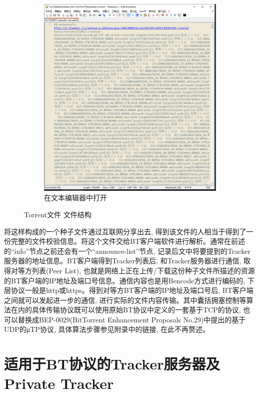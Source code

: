 \begin{figure}[ht!]
\begin{subfigure}{0.45\textwidth}
		\includegraphics[width=\textwidth]{support-files/2.1-torrent-file-in-text-editor.png} 
		\caption{在文本编辑器中打开}
		\label{fig:torrent_in_text_editor}
	\end{subfigure}
	\caption{Torrent文件 文件结构}
	\label{fig:torrent}
\end{figure}

将这样构成的一个种子文件通过互联网分享出去, 得到该文件的人相当于得到了一份完整的文件校验信息。将这个文件交给BT客户端软件进行解析。通常在前述的``info''节点之前还会有一个``announce-list''节点, 记录后文中将要提到的Tracker服务器的地址信息。BT客户端得到Tracker列表后, 和Tracker服务器进行通信, 取得对等方列表(Peer List), 也就是网络上正在上传/下载这份种子文件所描述的资源的BT客户端的IP地址及端口号信息。通信内容也是用Bencode方式进行编码的, 下层协议一般是http或https。得到对等方BT客户端的IP地址及端口号后, BT客户端之间就可以发起进一步的通信, 进行实际的文件内容传输。其中囊括拥塞控制等算法在内的具体传输协议既可以使用原始BT协议中定义的一套基于TCP的协议, 也可以替换成BEP-0029\cite{arvidnorberg2009bep0029}(BitTorrent Enhancement Proposals No.29)中提出的基于UDP的μTP协议, 具体算法步骤参见附录中的链接, 在此不再赘述。


\section{适用于BT协议的Tracker服务器及Private Tracker}
\label{sec:TrackerAndPrivateTracker}

